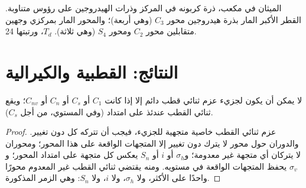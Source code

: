 \begin{omfigure}

{\small الميثان في مكعب، ذرة كربونه في المركز وذرات الهيدروجين على
رؤوس متناوبة. القطر الأكبر المار بذرة هيدروجين محور $C_3$
(وهي أربعة)؛ والمحور المار بمركزي وجهين متقابلين محور $C_2$ ومحور
$S_4$ (وهي ثلاثة).  $T_d$، ورتبتها 24.}
\end{omfigure}

\section{النتائج: القطبية والكيرالية}

\begin{theorem}\label{thm:b3:point-groups:polar}
لا يمكن أن يكون لجزيء عزم ثنائي قطب دائم إلا إذا كانت 
$C_1$ أو $C_s$ أو $C_n$ أو $C_{nv}$؛ ويقع ثنائي القطب عندئذ على امتداد 
(وفي المستوي، من أجل $C_s$).
\end{theorem}

\begin{proof}
عزم ثنائي القطب خاصية متجهية للجزيء، فيجب أن تتركه كل  دون تغيير. والدوران حول محور لا يترك دون تغيير إلا
المتجهات الواقعة على هذا المحور؛ ومحوران لا يتركان أي متجهة غير معدومة؛ 
و$\sigma_h$ أو $i$ أو $S_n$ يعكس كل متجهة على امتداد المحور؛ و$\sigma_v$
يحفظ المتجهات الواقعة في مستويه. ومنه يقتضي ثنائي القطب غير المعدوم محورًا واحدًا على الأكثر،
ولا $\sigma_h$، ولا $i$، ولا $S_n$: وهي الزمر المذكورة.
\end{proof}

